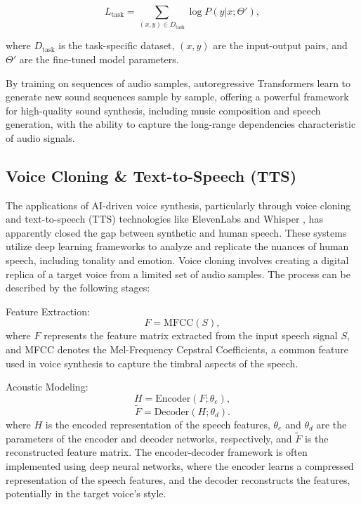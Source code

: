\documentclass[11pt,a4paper,oneside]{report}
\begin{document}
\begin{equation}
L_{\text{task}} = \sum_{(x, y) \in D_{\text{task}}} \log P(y | x; \Theta'),
\end{equation}

where $D_{\text{task}}$ is the task-specific dataset, $(x, y)$ are the input-output pairs, and $\Theta'$ are the fine-tuned model parameters.

By training on sequences of audio samples, autoregressive Transformers learn to generate new sound sequences sample by sample, offering a powerful framework for high-quality sound synthesis, including music composition and speech generation, with the ability to capture the long-range dependencies characteristic of audio signals.

\subsection{Voice Cloning \& Text-to-Speech (TTS)}

The applications of AI-driven voice synthesis, particularly through voice cloning and text-to-speech (TTS) technologies like ElevenLabs \cite{elevenlabs} and Whisper \cite{OpenAIWhisper}, has apparently closed the gap between synthetic and human speech. 
These systems utilize deep learning frameworks to analyze and replicate the nuances of human speech, including tonality and emotion. 
Voice cloning involves creating a digital replica of a target voice from a limited set of audio samples. 
The process can be described by the following stages:

Feature Extraction:
\begin{equation}
F = \text{MFCC}(S),
\end{equation}
where $F$ represents the feature matrix extracted from the input speech signal $S$, and MFCC denotes the Mel-Frequency Cepstral Coefficients, a common feature used in voice synthesis to capture the timbral aspects of the speech.

Acoustic Modeling:
\begin{equation}
H = \text{Encoder}(F; \theta_e),
\end{equation}
\begin{equation}
\tilde{F} = \text{Decoder}(H; \theta_d).
\end{equation}
where $H$ is the encoded representation of the speech features, $\theta_e$ and $\theta_d$ are the parameters of the encoder and decoder networks, respectively, and $\tilde{F}$ is the reconstructed feature matrix. The encoder-decoder framework is often implemented using deep neural networks, where the encoder learns a compressed representation of the speech features, and the decoder reconstructs the features, potentially in the target voice's style.
\end{document}
